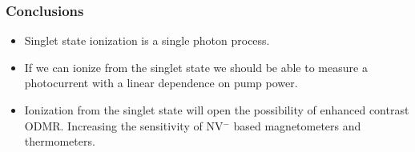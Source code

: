 \documentclass{beamer}
\begin{document}
\begin{frame}\frametitle{Conclusions}
    \begin{itemize}
        \item Singlet state ionization is a single photon process.
        \item If we can ionize from the singlet state we should be able to measure a photocurrent with a linear dependence on pump power.
        \item Ionization from the singlet state will open the possibility of enhanced contrast ODMR. Increasing the sensitivity of NV$^-$ based magnetometers and thermometers.
    \end{itemize}
\end{frame}
\end{document}
